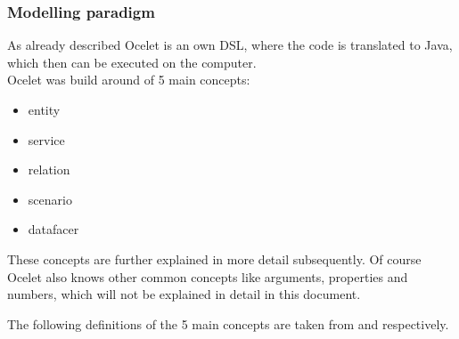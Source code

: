 \subsubsection{Modelling paradigm}
\par
As already described Ocelet is an own DSL, where the code is translated to Java, which then can be executed on the computer.\\
Ocelet was build around of 5 main concepts:
\begin{itemize}
	\item entity
	\item service
	\item relation
	\item scenario
	\item datafacer
\end{itemize}
These concepts are further explained in more detail subsequently. Of course Ocelet also knows other common concepts like arguments, properties and numbers, which will not be explained in detail in this document.
\par
The following definitions of the 5 main concepts are taken from \autocite{dsl:ocelet-onto} and \autocite{dsl:ocelet-design} respectively.
